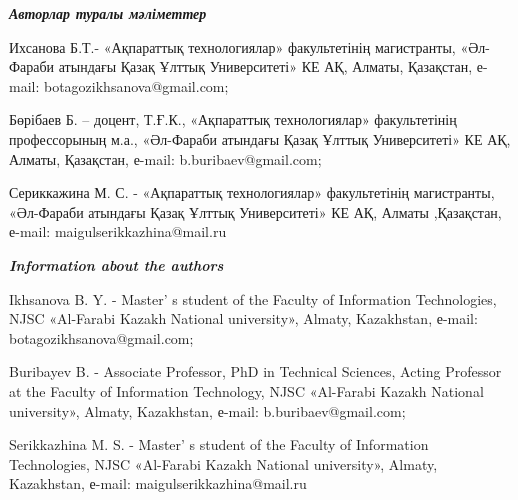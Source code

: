 \begin{authorinfo}
\emph{{\bfseries Авторлар туралы мәліметтер}}

Ихсанова Б.Т.- «Ақпараттық технологиялар» факультетінің магистранты,
«Әл-Фараби атындағы Қазақ Ұлттық Университеті» КЕ АҚ, Алматы, Қазақстан,
е-mail:
botagozikhsanova@gmail.com;

\href{https://orcid.org/0009-0007-9202-9650}{}

Бөрібаев Б. -- доцент, Т.Ғ.К., «Ақпараттық технологиялар» факультетінің
профессорының м.а., «Әл-Фараби атындағы Қазақ Ұлттық Университеті» КЕ
АҚ, Алматы, Қазақстан, е-mail: b.buribaev@gmail.com;

\href{https://orcid.org/0009-0004-8866-9581}{}

Сериккажина М. С. - «Ақпараттық технологиялар» факультетінің
магистранты, «Әл-Фараби атындағы Қазақ Ұлттық Университеті» КЕ АҚ,
Алматы ,Қазақстан, е-mail: maigulserikkazhina@mail.ru

\href{https://orcid.org/0009-0001-0280-3099}{}

\emph{{\bfseries Information about the authors}}

Ikhsanova B. Y. - Master' s student of the Faculty of
Information Technologies, NJSC «Al-Farabi Kazakh National university»,
Almaty, Kazakhstan, е-mail:
botagozikhsanova@gmail.com;

Buribayev B. - Associate Professor, PhD in Technical Sciences, Acting
Professor at the Faculty of Information Technology, NJSC «Al-Farabi
Kazakh National university», Almaty, Kazakhstan, е-mail:
b.buribaev@gmail.com;

Serikkazhina M. S. - Master' s student of the Faculty of
Information Technologies, NJSC «Al-Farabi Kazakh National
university», Almaty, Kazakhstan, е-mail: maigulserikkazhina@mail.ru\
\end{authorinfo}
